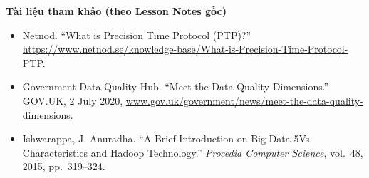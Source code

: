 \textbf{Tài liệu tham khảo (theo Lesson Notes gốc)}
\begin{itemize}
  \item Netnod. ``What is Precision Time Protocol (PTP)?'' \url{https://www.netnod.se/knowledge-base/What-is-Precision-Time-Protocol-PTP}.
  \item Government Data Quality Hub. ``Meet the Data Quality Dimensions.'' GOV.UK, 2 July 2020, \url{www.gov.uk/government/news/meet-the-data-quality-dimensions}.
  \item Ishwarappa, J. Anuradha. ``A Brief Introduction on Big Data 5Vs Characteristics and Hadoop Technology.'' \textit{Procedia Computer Science}, vol.~48, 2015, pp.~319--324.
\end{itemize}


